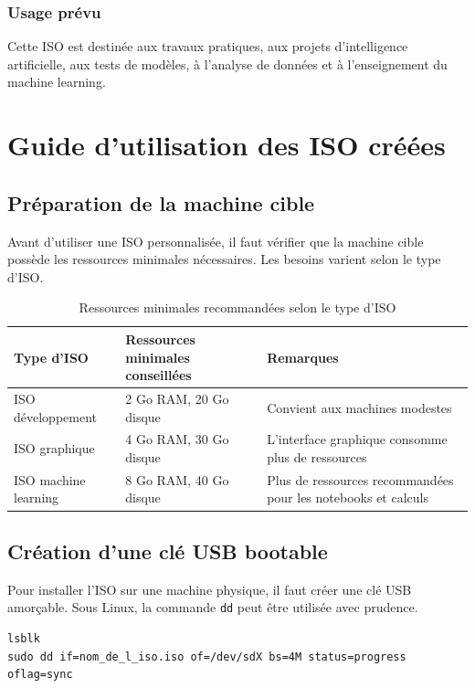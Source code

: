 \documentclass[12pt,a4paper]{article}
\begin{document}
\subsubsection*{Usage prévu}

Cette ISO est destinée aux travaux pratiques, aux projets d'intelligence artificielle, aux tests de modèles, à l'analyse de données et à l'enseignement du machine learning.

\section{Guide d'utilisation des ISO créées}

\subsection{Préparation de la machine cible}

Avant d'utiliser une ISO personnalisée, il faut vérifier que la machine cible possède les ressources minimales nécessaires. Les besoins varient selon le type d'ISO.

\begin{table}[H]
\centering
\begin{tabular}{p{4cm}p{4cm}p{6cm}}
\toprule
Type d'ISO & Ressources minimales conseillées & Remarques \\
\midrule
ISO développement & 2 Go RAM, 20 Go disque & Convient aux machines modestes \\
ISO graphique & 4 Go RAM, 30 Go disque & L'interface graphique consomme plus de ressources \\
ISO machine learning & 8 Go RAM, 40 Go disque & Plus de ressources recommandées pour les notebooks et calculs \\
\bottomrule
\end{tabular}
\caption{Ressources minimales recommandées selon le type d'ISO}
\end{table}

\subsection{Création d'une clé USB bootable}

Pour installer l'ISO sur une machine physique, il faut créer une clé USB amorçable. Sous Linux, la commande \texttt{dd} peut être utilisée avec prudence.

\begin{lstlisting}
lsblk
sudo dd if=nom_de_l_iso.iso of=/dev/sdX bs=4M status=progress oflag=sync
\end{lstlisting}
\end{document}
